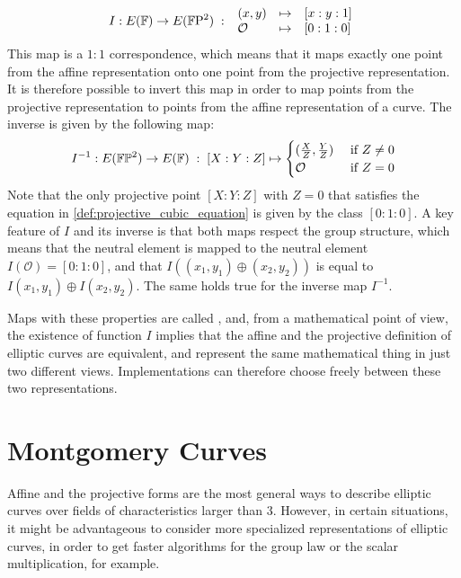 \begin{equation}\label{eq:weierstrass-isomorphism-map}
I : E(\mathbb{F}) \to E(\mathbb{F}\mathrm{P}^2)\;:\;
\begin{array}{lcl}
(x,y)       &\mapsto & [x:y:1]\\
\mathcal{O} &\mapsto & [0:1:0]
\end{array}
\end{equation}
This map is a $1:1$ correspondence, which means that it maps exactly one point from the affine representation onto one point from the projective representation. It is therefore possible to invert this map in order to map points from the projective representation to points from the affine representation of a  curve. The inverse is given by the following map:
\begin{equation}
I^{-1} : E(\mathbb{F}\mathbb{P}^2)\to E(\mathbb{F}) \;:\; [X:Y:Z] \mapsto \begin{cases}
(\frac{X}{Z},\frac{Y}{Z}) & \text{ if } Z\neq 0\\
\mathcal{O} & \text{ if } Z=0
\end{cases}
\end{equation}
Note that the only projective point $[X:Y:Z]$ with $Z = 0$ that satisfies the equation in \ref{def:projective_cubic_equation} is given by the class $[0:1:0]$. A key feature of $I$ and its inverse is that both maps respect the group structure, which means that the neutral element is mapped to the neutral element $I(\mathcal{O})=[0:1:0]$, and that  $I((x_1,y_1)\oplus (x_2,y_2))$ is equal to $I(x_1,y_1)\oplus I(x_2,y_2)$. The same holds true for the inverse map $I^{-1}$.

Maps with these properties are called , and, from a mathematical point of view, the existence of function $I$ implies that the affine and the projective definition of  elliptic curves are equivalent, and represent the same mathematical thing in just two different views. Implementations can therefore choose freely between these two representations. 


\section{Montgomery Curves}\label{sec:montgomery}
Affine and the projective  forms are the most general ways to describe elliptic curves over fields of characteristics larger than $3$. However, in certain situations, it might be advantageous to consider more specialized representations of elliptic curves, in order to get faster algorithms for the group law or the scalar multiplication, for example. 


